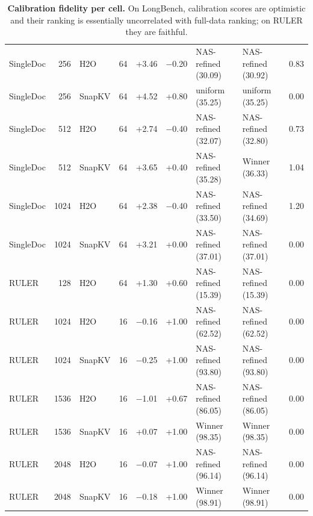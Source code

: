 \begin{table}[t]
\begin{tabular}{@{}l r l r r r l l r@{}}
    SingleDoc & 256 & H2O & 64 & +3.46 & $-$0.20 & NAS-refined (30.09) & NAS-refined (30.92) & 0.83 \\
    SingleDoc & 256 & SnapKV & 64 & +4.52 & +0.80 & uniform (35.25) & uniform (35.25) & 0.00 \\
    SingleDoc & 512 & H2O & 64 & +2.74 & $-$0.40 & NAS-refined (32.07) & NAS-refined (32.80) & 0.73 \\
    SingleDoc & 512 & SnapKV & 64 & +3.65 & +0.40 & NAS-refined (35.28) & Winner (36.33) & 1.04 \\
    SingleDoc & 1024 & H2O & 64 & +2.38 & $-$0.40 & NAS-refined (33.50) & NAS-refined (34.69) & 1.20 \\
    SingleDoc & 1024 & SnapKV & 64 & +3.21 & +0.00 & NAS-refined (37.01) & NAS-refined (37.01) & 0.00 \\
    RULER & 128 & H2O & 64 & +1.30 & +0.60 & NAS-refined (15.39) & NAS-refined (15.39) & 0.00 \\
    RULER & 1024 & H2O & 16 & $-$0.16 & +1.00 & NAS-refined (62.52) & NAS-refined (62.52) & 0.00 \\
    RULER & 1024 & SnapKV & 16 & $-$0.25 & +1.00 & NAS-refined (93.80) & NAS-refined (93.80) & 0.00 \\
    RULER & 1536 & H2O & 16 & $-$1.01 & +0.67 & NAS-refined (86.05) & NAS-refined (86.05) & 0.00 \\
    RULER & 1536 & SnapKV & 16 & +0.07 & +1.00 & Winner (98.35) & Winner (98.35) & 0.00 \\
    RULER & 2048 & H2O & 16 & $-$0.07 & +1.00 & NAS-refined (96.14) & NAS-refined (96.14) & 0.00 \\
    RULER & 2048 & SnapKV & 16 & $-$0.18 & +1.00 & Winner (98.91) & Winner (98.91) & 0.00 \\
    \bottomrule
  \end{tabular}
  \caption{\textbf{Calibration fidelity per cell.} On LongBench, calibration scores are optimistic and their ranking is essentially uncorrelated with full-data ranking; on RULER they are faithful.}
  \label{tab:app-calib}
\end{table}

